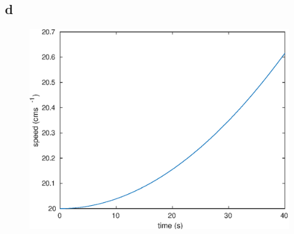 \subsection{d}
\begin{figure}[h]
    \centering
    \includegraphics[scale=0.7, center]{./eps/topic3_d.eps}
    \caption{}
    \label{fig:Topic3-d}
\end{figure}

